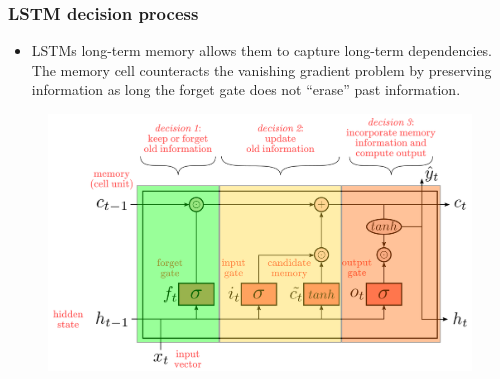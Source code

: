 \documentclass{beamer}
\begin{document}
		\begin{frame}
			\frametitle{LSTM decision process}
			\begin{itemize}
				\item LSTMs long-term memory allows them to capture long-term dependencies. The memory cell counteracts the vanishing gradient problem by preserving information as long the forget gate does not “erase” past information.
			\end{itemize}
			\begin{figure}
				\centering
				\includegraphics[scale=0.35]{images/lstm-choices}
				
			\end{figure}
			
		\end{frame}
	
\end{document}
